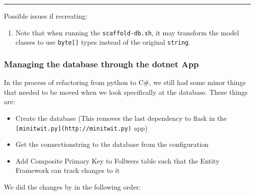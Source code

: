 \begin{center}\rule{0.5\linewidth}{0.5pt}\end{center}

Possible issues if recreating:

\begin{enumerate}
    \item Note that when running the \texttt{scaffold-db.sh}, it may transform the model classes to use \texttt{byte{[}{]}} types instead of the original \texttt{string}.
\end{enumerate}

\subsubsection{Managing the database through the dotnet App}
\label{log:managing-the-database-through-the-dotnet-app}

In the process of refactoring from python to C\#, we still had some
minor things that needed to be moved when we look specifically at the
database. These things are:

\begin{itemize}
    \item Create the database (This removes the last dependency to flask in the \texttt{{[}minitwit.py{]}(http://minitwit.py)} app)
    \item Get the connectionstring to the database from the configuration
    \item Add Composite Primary Key to Follwers table such that the Entity Framework can track changes to it
\end{itemize}

We did the changes by in the following order:

